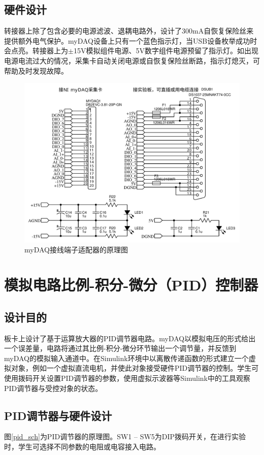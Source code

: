 \documentclass[11pt,a4paper]{article}
\begin{document}
\subsection{硬件设计}
转接器上除了包含必要的电源滤波、退耦电路外，设计了300mA自恢复保险丝来提供额外电气保护。myDAQ设备上只有一个蓝色指示灯，当USB设备枚举成功时会点亮。转接器上为$\pm$15V模拟组件电源、5V数字组件电源预留了指示灯。如出现电源电流过大的情况，采集卡自动关闭电源或自恢复保险丝断路，指示灯熄灭，可帮助及时发现故障。

\begin{figure}[H]\centering
  \includegraphics[width=12cm]{./figs/conv_sch.pdf}
  \caption{myDAQ接线端子适配器的原理图}\label{conv_sch}
\end{figure}


\section{模拟电路比例-积分-微分（PID）控制器}

\subsection{设计目的}
板卡上设计了基于运算放大器的PID调节器电路。myDAQ以模拟电压的形式给出一个误差量，电路将通过其比例-积分-微分环节输出一个调节量，并反馈到myDAQ的模拟输入通道中。在Simulink环境中以离散传递函数的形式建立一个虚拟对象，例如一个虚拟直流电机，并使此对象接受硬件PID调节器的控制。学生可使用拨码开关设置PID调节器的参数，使用虚拟示波器等Simulink中的工具观察PID调节器与受控对象的状态。

\subsection{PID调节器与硬件设计}
图\ref{pid_sch}为PID调节器的原理图。SW1 -- SW5为DIP拨码开关，在进行实验时，学生可选择不同参数的电阻或电容接入电路。
\end{document}
